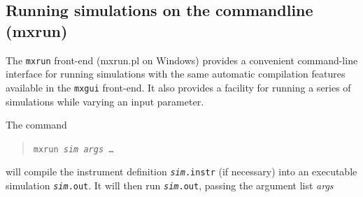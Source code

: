 \subsection{Running simulations on the commandline (mxrun)}
\label{s:mxrun}

The \verb+mxrun+ front-end (mxrun.pl on Windows) provides a convenient command-line
interface for running simulations with the same automatic compilation
features available in the \verb+mxgui+ front-end. It also provides a
facility for running a series of simulations while varying an input
parameter.

The command
\begin{quote}
  \texttt{mxrun \textit{sim} \textit{args\/} \ldots}
\end{quote}
will compile the instrument definition \texttt{\textit{sim}.instr} (if
necessary) into an executable simulation \texttt{\textit{sim}.out}. It
will then run \texttt{\textit{sim}.out}, passing the argument list \textit{
  args}

